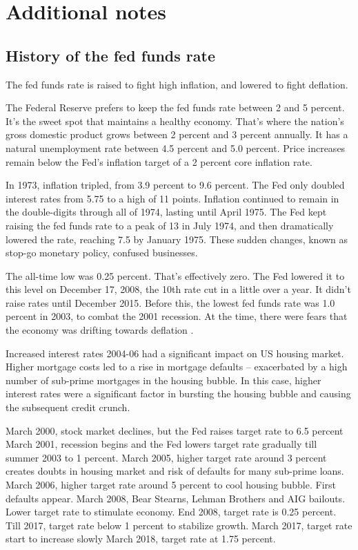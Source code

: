 \section{Additional notes}

\subsection{History of the fed funds rate}
The fed funds rate is raised to fight high inflation, and lowered to fight deflation. 

The Federal Reserve prefers to keep the fed funds rate between 2 and 5 percent. It's the sweet spot that maintains a healthy economy. That's where the nation's gross domestic product grows between 2 percent and 3 percent annually. It has a natural unemployment rate between 4.5 percent and 5.0 percent. Price increases remain below the Fed's inflation target of a 2 percent core inflation rate.

In 1973, inflation tripled, from 3.9 percent to 9.6 percent. The Fed only doubled interest rates from 5.75 to a high of 11 points. Inflation continued to remain in the double-digits through all of 1974, lasting until April 1975. The Fed kept raising the fed funds rate to a peak of 13 in July 1974, and then dramatically lowered the rate, reaching 7.5 by January 1975. These sudden changes, known as stop-go monetary policy, confused businesses.

The all-time low was 0.25 percent. That's effectively zero. The Fed lowered it to this level on December 17, 2008, the 10th rate cut in a little over a year. It didn't raise rates until December 2015. Before this, the lowest fed funds rate was 1.0 percent in 2003, to combat the 2001 recession. At the time, there were fears that the economy was drifting towards deflation \citep{target_rate_history}.

Increased interest rates 2004-06 had a significant impact on US housing market. Higher mortgage costs led to a rise in mortgage defaults – exacerbated by a high number of sub-prime mortgages in the housing bubble. In this case, higher interest rates were a significant factor in bursting the housing bubble and causing the subsequent credit crunch.

March 2000, stock market declines, but the Fed raises target rate to 6.5 percent
March 2001, recession begins and the Fed lowers target rate gradually till summer 2003 to 1 percent.
March 2005, higher target rate around 3 percent creates doubts in housing market and risk of defaults for many sub-prime loans.
March 2006, higher target rate around 5 percent to cool housing bubble. First defaults appear.
March 2008, Bear Stearns, Lehman Brothers and AIG bailouts. Lower target rate to stimulate economy.
End 2008, target rate is 0.25 percent.
Till 2017, target rate below 1 percent to stabilize growth.
March 2017, target rate start to increase slowly
March 2018, target rate at 1.75 percent.

